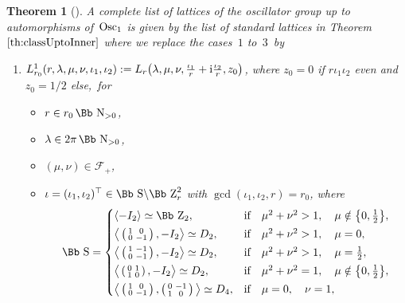 \documentclass[pdftex]{sigma}
\newcommand\NN{{\mbox{\Bb N}}}
\newcommand\ZZ{{\mbox{\Bb Z}}}
\newcommand\SSS{{\mbox{\Bb S}}}
\newcommand\cF{{\mathcal F}}
\newcommand{\Osc}{{\rm Osc}}
\numberwithin{equation}{section}
\newtheorem{Theorem}{Theorem}[section]
\begin{document}
\begin{Theorem}[\cite{F}]
A complete list of lattices of the oscillator group up to automorphisms of~$\Osc_1$ is given by the list of standard lattices in Theorem~$\ref{th:classUptoInner}$ where we replace the cases~$1$ to~$3$~by
\begin{enumerate}\itemsep=0pt
\item[$1.$] $L^1_{r_0}(r,\lambda,\mu,\nu,\iota_1,\iota_2):= L_r\big(\lambda,\mu,\nu,\frac{\iota_1}{r}+{\rm i}\frac{\iota_2}{r},z_0\big)$, where $z_0=0$ if $r\iota_1\iota_2$ even and $z_0=1/2$ else,~for
\begin{itemize}
\item[$\circ$] $r\in r_0\,\NN_{>0}$,
\item[$\circ$] $\lambda\in 2\pi\,\NN_{>0}$,
\item[$\circ$] $(\mu,\nu)\in\cF_+$,
\item[$\circ$] $\iota=(\iota_1,\iota_2)^\top\in\SSS\backslash\ZZ^2_r$ with $\gcd(\iota_1,\iota_2,r)=r_0$, where
\begin{gather*}
\SSS=\begin{cases}
\langle-I_2\rangle\simeq \ZZ_2, & \text{if}\quad \mu^2+\nu^2>1,\quad \mu\notin\big\{0,\frac{1}{2}\big\},
\\[0.5ex]
\big\langle \left(\begin{smallmatrix}1&0\\0&-1\end{smallmatrix}\right),-I_2\big\rangle \simeq D_2,& \text{if}\quad \mu^2+\nu^2>1,\quad \mu=0,
\\[0.5ex]
\big\langle \left(\begin{smallmatrix}1&-1\\0&-1\end{smallmatrix}\right),-I_2\big\rangle\simeq D_2, & \text{if}\quad \mu^2+\nu^2>1,\quad \mu=\frac{1}{2},
\\[0.5ex]
\big\langle \left(\begin{smallmatrix}0&1\\1&0\end{smallmatrix}\right),-I_2\big\rangle\simeq D_2, & \text{if}\quad \mu^2+\nu^2=1,\quad \mu\notin\big\{0,\frac{1}{2}\big\},
\\[0.5ex]
\big\langle \left(\begin{smallmatrix}1&0\\0&-1\end{smallmatrix}\right),\left(\begin{smallmatrix}0&-1\\1&0\end{smallmatrix}\right)\big\rangle\simeq D_4, & \text{if}\quad \mu=0,\quad \nu=1,

\end{cases}
\end{gather*}
\end{itemize}
\end{enumerate}
\end{Theorem}
\end{document}
